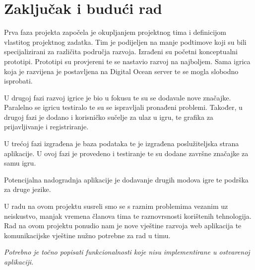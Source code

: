 \chapter{Zaključak i budući rad}
		
		 {Prva faza projekta započela je okupljanjem projektnog tima i definicijom vlastitog projektnog zadatka.
		 	Tim je podijeljen na manje podtimove koji su bili specijalizirani za različita područja razvoja. Izrađeni su početni konceptualni prototipi.
		 	Prototipi su provjereni te se nastavio razvoj na najboljem. Sama igrica koja je razvijena je postavljena na Digital Ocean server te se mogla
		 	slobodno isprobati.
		 	
		 	
		 	U drugoj fazi razvoj igrice je bio u fokusu te su se dodavale nove značajke. Paralelno se igricu testiralo te su se ispravljali pronađeni problemi.
		 	Također, u drugoj fazi je dodano i korisničko sučelje za ulaz u igru, te grafika za prijavljivanje i registriranje.
		 	
		 	
		 	U trećoj fazi izgrađena je baza podataka te je izgrađena poslužiteljska strana aplikacije. U ovoj fazi je provedeno i testiranje te su dodane završne značajke za samu igru.
		 	
		 	
		 	Potencijalna nadogradnja aplikacije je dodavanje drugih modova igre te podrška za druge jezike.
		 	
		 	
		 	U radu na ovom projektu susreli smo se s raznim problemima vezanim uz neiskustvo, manjak vremena članova tima te raznovrsnosti korištenih tehnologija.
		 	Rad na ovom projektu ponudio nam je nove vještine razvoja web aplikacija te komunikacijske vještine nužno potrebne za rad u timu.}
	 	
		
		 \textit{Potrebno je točno popisati funkcionalnosti koje nisu implementirane u ostvarenoj aplikaciji.}
		
		\eject 